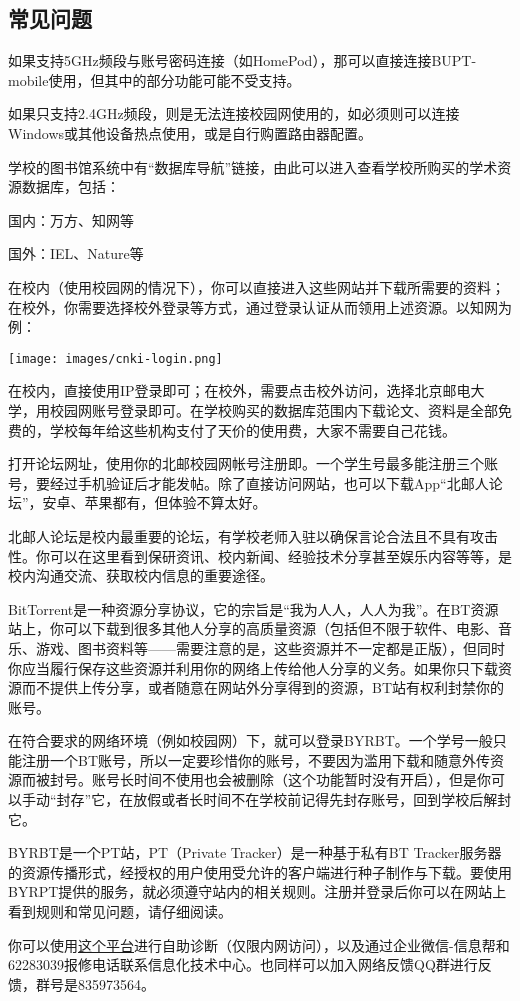 \subsection*{常见问题}


如果支持5GHz频段与账号密码连接（如HomePod），那可以直接连接BUPT-mobile使用，但其中的部分功能可能不受支持。

如果只支持2.4GHz频段，则是无法连接校园网使用的，如必须则可以连接Windows或其他设备热点使用，或是自行购置路由器配置。


学校的图书馆系统中有“数据库导航”链接，由此可以进入查看学校所购买的学术资源数据库，包括：

国内：万方、知网等

国外：IEL、Nature等

在校内（使用校园网的情况下），你可以直接进入这些网站并下载所需要的资料；在校外，你需要选择校外登录等方式，通过登录认证从而领用上述资源。以知网为例：

\begin{center}
    \texttt{[image: images/cnki-login.png]}
\end{center}

在校内，直接使用IP登录即可；在校外，需要点击校外访问，选择北京邮电大学，用校园网账号登录即可。在学校购买的数据库范围内下载论文、资料是全部免费的，学校每年给这些机构支付了天价的使用费，大家不需要自己花钱。


打开论坛网址，使用你的北邮校园网帐号注册即。一个学生号最多能注册三个账号，要经过手机验证后才能发帖。除了直接访问网站，也可以下载App“北邮人论坛”，安卓、苹果都有，但体验不算太好。

北邮人论坛是校内最重要的论坛，有学校老师入驻以确保言论合法且不具有攻击性。你可以在这里看到保研资讯、校内新闻、经验技术分享甚至娱乐内容等等，是校内沟通交流、获取校内信息的重要途径。


BitTorrent是一种资源分享协议，它的宗旨是“我为人人，人人为我”。在BT资源站上，你可以下载到很多其他人分享的高质量资源（包括但不限于软件、电影、音乐、游戏、图书资料等——需要注意的是，这些资源并不一定都是正版），但同时你应当履行保存这些资源并利用你的网络上传给他人分享的义务。如果你只下载资源而不提供上传分享，或者随意在网站外分享得到的资源，BT站有权利封禁你的账号。

在符合要求的网络环境（例如校园网）下，就可以登录BYRBT。一个学号一般只能注册一个BT账号，所以一定要珍惜你的账号，不要因为滥用下载和随意外传资源而被封号。账号长时间不使用也会被删除（这个功能暂时没有开启），但是你可以手动“封存”它，在放假或者长时间不在学校前记得先封存账号，回到学校后解封它。

BYRBT是一个PT站，PT（Private Tracker）是一种基于私有BT Tracker服务器的资源传播形式，经授权的用户使用受允许的客户端进行种子制作与下载。要使用BYRPT提供的服务，就必须遵守站内的相关规则。注册并登录后你可以在网站上看到规则和常见问题，请仔细阅读。


你可以使用\href{https://buptnet.icu}{这个平台}进行自助诊断（仅限内网访问），以及通过企业微信-信息帮和62283039报修电话联系信息化技术中心。也同样可以加入网络反馈QQ群进行反馈，群号是835973564。
